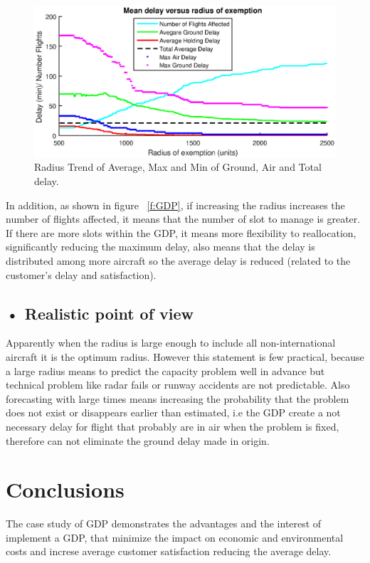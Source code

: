 \documentclass[final,1p]{elsarticle}
\begin{document}
 \begin{figure}[h]
 \centering
 \includegraphics[width=5in]{./figs/meanradius.eps}
 \caption{Radius Trend of Average, Max and Min of Ground, Air and Total delay.}
 \label{f:meanradious}
 \end{figure} 
 
In addition, as shown in figure ~\ref{f:GDP}, if increasing the radius increases the number of flights affected, it means that the number of slot to manage is greater. If there are more slots within the GDP, it means more flexibility to reallocation, significantly reducing the maximum delay, also means that the delay is distributed among more aircraft so the average delay is reduced (related to the customer's delay and satisfaction).

\subsection{• Realistic point of view }
\label{subSec:radius}

Apparently when the radius is large enough to include all non-international aircraft it is the optimum radius. However this statement is few practical, because a large radius means to predict the capacity problem well in advance but technical problem like radar fails or runway accidents are not predictable. Also forecasting with large times means increasing the probability that the problem does not exist or disappears earlier than estimated, i.e the GDP create a not necessary delay for flight that probably are in air when the problem is fixed, therefore can not eliminate the ground delay made in origin.

\section{Conclusions}
\label{Sec:Sect5}

The case study of GDP demonstrates the advantages and the interest of implement a GDP, that minimize the impact on economic and environmental costs and increse average customer satisfaction reducing the average delay.
\\
\end{document}
